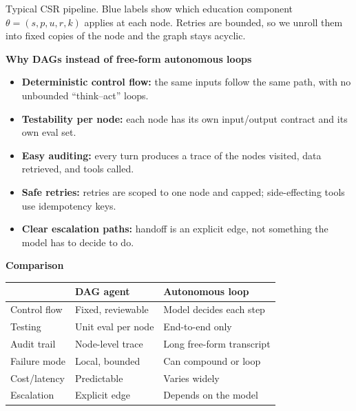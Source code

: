 \documentclass[10pt]{article}
\begin{document}
\vspace{-8pt}
{\scriptsize\color{muted} Typical CSR pipeline. Blue labels show which education component $\theta=(s,p,u,r,k)$ applies at each node.
Retries are bounded, so we unroll them into fixed copies of the node and the graph stays acyclic.\par}

\vspace{3pt}
\begin{minipage}[t]{0.49\linewidth}
\textbf{\color{navy}Why DAGs instead of free-form autonomous loops}
\begin{itemize}
  \item \textbf{Deterministic control flow:} the same inputs follow the same path, with no unbounded ``think--act'' loops.
  \item \textbf{Testability per node:} each node has its own input/output contract and its own eval set.
  \item \textbf{Easy auditing:} every turn produces a trace of the nodes visited, data retrieved, and tools called.
  \item \textbf{Safe retries:} retries are scoped to one node and capped; side-effecting tools use idempotency keys.
  \item \textbf{Clear escalation paths:} handoff is an explicit edge, not something the model has to decide to do.
\end{itemize}
\end{minipage}\hfill
\begin{minipage}[t]{0.48\linewidth}
\textbf{\color{navy}Comparison}\\[2pt]
\footnotesize
\begin{tabularx}{\linewidth}{@{}>{\raggedright\arraybackslash}p{19mm}XX@{}}
\toprule
 & \textbf{DAG agent} & \textbf{Autonomous loop} \\
\midrule
Control flow & Fixed, reviewable & Model decides each step \\
Testing      & Unit eval per node & End-to-end only \\
Audit trail  & Node-level trace & Long free-form transcript \\
Failure mode & Local, bounded & Can compound or loop \\
Cost/latency & Predictable & Varies widely \\
Escalation   & Explicit edge & Depends on the model \\
\bottomrule
\end{tabularx}
\end{minipage}
\end{document}

